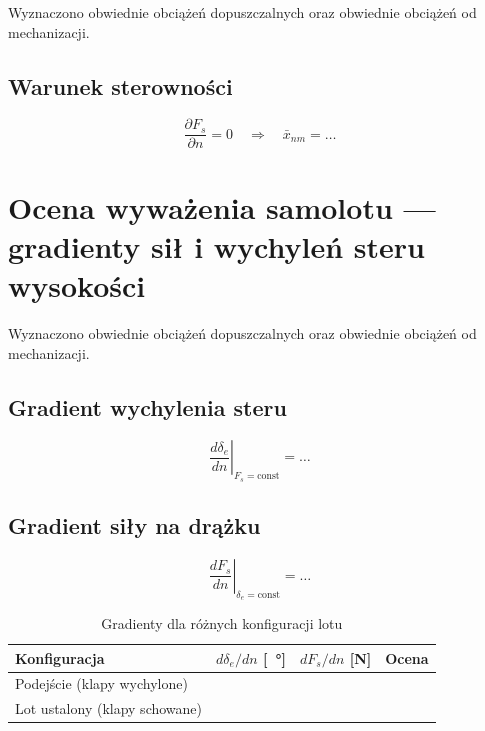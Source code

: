 \documentclass[12pt, a4paper]{article}
\begin{document}
Wyznaczono obwiednie obciążeń dopuszczalnych oraz obwiednie obciążeń od mechanizacji.

\subsection{Warunek sterowności}

\begin{equation}
  \frac{\partial F_s}{\partial n} = 0 \quad \Rightarrow \quad
  \bar{x}_{nm} = \ldots
  \label{eq:sterownosc}
\end{equation}

\section{Ocena wyważenia samolotu — gradienty sił i wychyleń steru wysokości}

Wyznaczono obwiednie obciążeń dopuszczalnych oraz obwiednie obciążeń od mechanizacji.

\subsection{Gradient wychylenia steru}

\begin{equation}
  \left.\frac{d\delta_e}{dn}\right|_{F_s=\text{const}} = \ldots
\end{equation}

\subsection{Gradient siły na drążku}

\begin{equation}
  \left.\frac{dF_s}{dn}\right|_{\delta_e=\text{const}} = \ldots
\end{equation}

\begin{table}[H]
  \centering
  \caption{Gradienty dla różnych konfiguracji lotu}
  \label{tab:gradienty}
  \begin{tabularx}{\textwidth}{Xccc}
    \toprule
    \textbf{Konfiguracja} & $d\delta_e/dn$ [\SI{}{\degree}] &
    $dF_s/dn$ [\si{N}] & \textbf{Ocena} \\
    \midrule
    Podejście (klapy wychylone)  & & & \\
    Lot ustalony (klapy schowane) & & & \\
    \bottomrule
  \end{tabularx}
\end{table}
\end{document}
